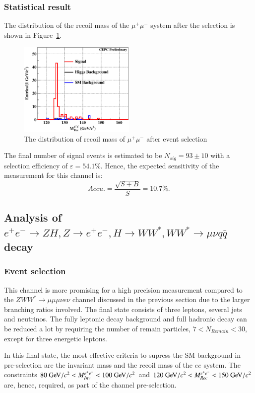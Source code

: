 \documentclass[11pt,a4paper]{cepcnote}
\begin{document}
\subsubsection{Statistical result}
The distribution of the recoil mass of the $\mu^+\mu^-$ system after 
the selection is shown in Figure~\ref{fig:uuhevuvrecfit}.
\begin{figure}[H]
\centering
\includegraphics[width=0.5\textwidth]{e2e2H/evuv/uuh_recfit}
\caption[]{The distribution of recoil mass of $\mu^+\mu^-$ after event selection}
\label{fig:uuhevuvrecfit}
\end{figure}

The final number of signal events is estimated to be $N_{sig} = 93\pm10$ 
with a selection efficiency of $\varepsilon = 54.1\%$. 
Hence, the expected sensitivity of the measurement for this channel is:
\begin{equation*}
Accu.=\frac{\sqrt{S+B}}{S} = 10.7\%.
\end{equation*}

\subsection{Analysis of $e^+e^-\rightarrow ZH, Z\rightarrow e^+e^-, H\rightarrow WW^*, WW^*\rightarrow \mu\nu q\bar{q}$ decay}
\subsubsection{Event selection}
This channel is more promising for a high precision measurement compared to
the $ZWW^*\to \mu\mu\mu\nu  e\nu$ channel  discussed in the previous section
due to the larger branching ratios involved.
The final state consists of three leptons, several jets and neutrinos.
The fully leptonic decay background {\color{blue} and full hadronic decay} can be reduced a lot
by requiring the number of remain particles, {\color{blue}$7 < N_{Remain} < 30$, except for three energetic leptons}.

In this final state, the most effective criteria to supress the
SM background in  pre-selection are the invariant mass and the recoil mass 
of the $ee$ system. The constraints $80\gev/c^2 < M_{Inv}^{e^+e^-} < 100\gev/c^2$
and $120\gev/c^2 < M_{Rec}^{e^+e^-} < 150\gev/c^2$ are, hence, required, as part
of the channel pre-selection.
\end{document}
